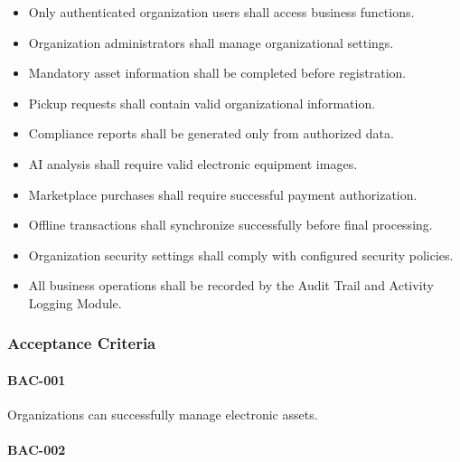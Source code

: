 \begin{itemize}

\item Only authenticated organization users shall access business
functions.

\item Organization administrators shall manage organizational settings.

\item Mandatory asset information shall be completed before registration.

\item Pickup requests shall contain valid organizational information.

\item Compliance reports shall be generated only from authorized data.

\item AI analysis shall require valid electronic equipment images.

\item Marketplace purchases shall require successful payment
authorization.

\item Offline transactions shall synchronize successfully before final
processing.

\item Organization security settings shall comply with configured
security policies.

\item All business operations shall be recorded by the Audit Trail and
Activity Logging Module.

\end{itemize}


\subsubsection*{Acceptance Criteria}

\paragraph{BAC-001}

Organizations can successfully manage electronic assets.

\paragraph{BAC-002}

